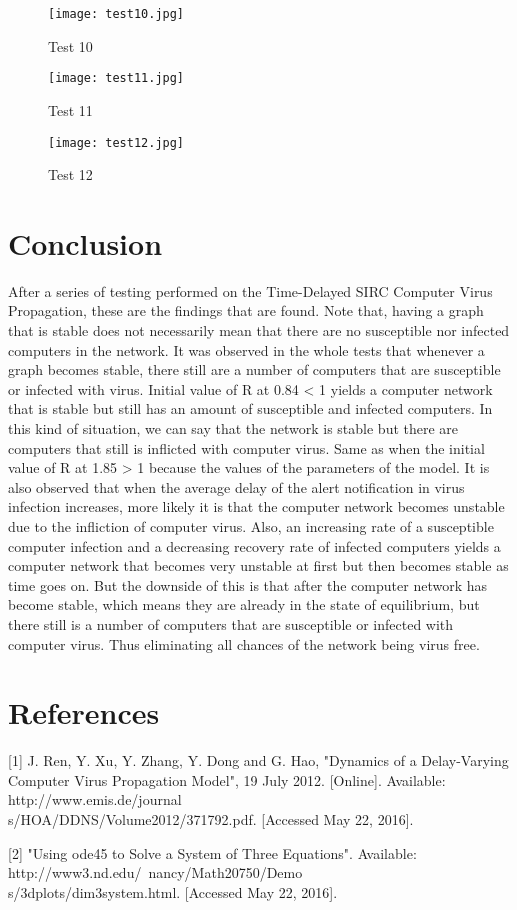 \documentclass{acm_proc_article-sp}
\begin{document}
\begin{figure}
  \texttt{[image: test10.jpg]}
  \caption{Test 10}
  \label{fig:test10}
\end{figure}

\begin{figure}
  \texttt{[image: test11.jpg]}
  \caption{Test 11}
  \label{fig:test11}
\end{figure}

\begin{figure}
  \texttt{[image: test12.jpg]}
  \caption{Test 12}
  \label{fig:test12}
\end{figure}

\section{Conclusion}
After a series of testing performed on the Time-Delayed SIRC Computer Virus Propagation, these are the findings that are found. Note that, having a graph that is stable does not necessarily mean that there are no susceptible nor infected computers in the network. It was observed in the whole tests that whenever a graph becomes stable, there still are a number of computers that are susceptible or infected with virus. Initial value of R at 0.84 < 1 yields a computer network that is stable but still has an amount of susceptible and infected computers. In this kind of situation, we can say that the network is stable but there are computers that still is inflicted with computer virus. Same as when the initial value of R at 1.85 > 1 because the values of the parameters of the model. It is also observed that when the average delay of the alert notification in virus infection increases, more likely it is that the computer network becomes unstable due to the infliction of computer virus. Also, an increasing rate of a susceptible computer infection and a decreasing recovery rate of infected computers yields a computer network that becomes very unstable at first but then becomes stable as time goes on. But the downside of this is that after the computer network has become stable, which means they are already in the state of equilibrium, but there still is a number of computers that are susceptible or infected with computer virus. Thus eliminating all chances of the network being virus free.

\section{References}
[1] J. Ren, Y. Xu, Y. Zhang, Y. Dong and G. Hao, "Dynamics of a Delay-Varying Computer Virus Propagation Model", 19 July 2012. [Online]. Available: http://www.emis.de/journal\\s/HOA/DDNS/Volume2012/371792.pdf. [Accessed May 22, 2016].

[2] "Using ode45 to Solve a System of Three Equations". Available: http://www3.nd.edu/~nancy/Math20750/Demo\\s/3dplots/dim3system.html. [Accessed May 22, 2016].
\end{document}
